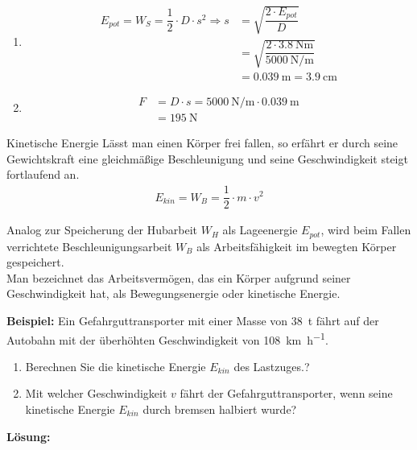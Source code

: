 \documentclass{beamer}
\begin{document}
{\begin{enumerate}
  \item
  \begin{align*}
  E_{pot}=W_S=\dfrac{1}{2}\cdot D\cdot s^{2}\Rightarrow s&=\sqrt{\dfrac{2\cdot E_{pot}}{D}}\\
  &=\sqrt{\dfrac{2\cdot \SI{3,8}{\newton\meter}}{\SI{5000}{\newton\per\meter}}}\\
  &=\SI{0,039}{\meter}=\SI{3,9}{\centi\meter}
  \end{align*}
  \item
    \begin{align*}
	F&=D\cdot s=\SI{5000}{\newton\per\meter}\cdot\SI{0,039}{\meter}\\
	&=\SI{195}{\newton}
  \end{align*}
  \end{enumerate}
  
  \begin{block}{Kinetische Energie}
Lässt man einen Körper frei fallen, so erfährt er durch seine Gewichtskraft eine gleichmäßige Beschleunigung und seine Geschwindigkeit steigt fortlaufend an.	
	\begin{align}
	E_{kin}=W_B=\dfrac{1}{2}\cdot m\cdot v^{2}
	\end{align}
  \end{block}
  Analog zur Speicherung der Hubarbeit $W_H$ als Lageenergie $E_{pot}$, wird beim Fallen verrichtete Beschleunigungsarbeit $W_B$ als Arbeitsfähigkeit im bewegten Körper gespeichert.\\
  Man bezeichnet das Arbeitsvermögen, das ein Körper aufgrund seiner Geschwindigkeit hat, als Bewegungsenergie oder kinetische Energie.
}
  \textbf{Beispiel:} Ein Gefahrguttransporter mit einer Masse von \SI{38}{\tonne} fährt auf der Autobahn mit der überhöhten Geschwindigkeit von \SI{108}{\kilo\meter\per\hour}.\\
  \begin{enumerate}
  	\item Berechnen Sie die kinetische Energie $E_{kin}$ des Lastzuges.?
  	\item Mit welcher Geschwindigkeit $v$ fährt der Gefahrguttransporter, wenn seine kinetische Energie $E_{kin}$ durch bremsen halbiert wurde?
  \end{enumerate}
  \newpage
  \textbf{Lösung:}
\end{document}
